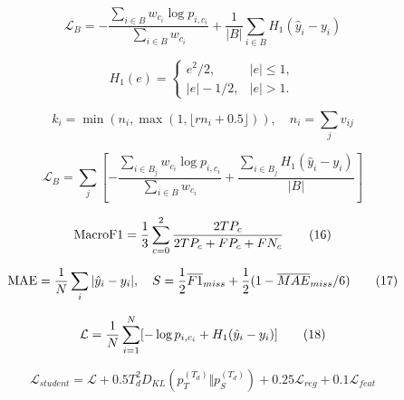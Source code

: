 \begin{equation}
\mathcal L_B=-\frac{\sum_{i\in B}w_{c_i}\log p_{i,c_i}}{\sum_{i\in B}w_{c_i}}+\frac{1}{|B|}\sum_{i\in B}H_1(\hat y_i-y_i)\tag{12}
\end{equation}

\begin{equation}
H_1(e)=\begin{cases}e^2/2,&|e|\le1,\\|e|-1/2,&|e|>1.\end{cases}\tag{13}
\end{equation}

\begin{equation}
k_i=\min(n_i,\max(1,\lfloor r n_i+0.5\rfloor)),\quad n_i=\sum_jv_{ij}\tag{14}
\end{equation}

\begin{equation}
\mathcal L_B=\sum_j\left[-\frac{\sum_{i\in B_j}w_{c_i}\log p_{i,c_i}}{\sum_{i\in B}w_{c_i}}+\frac{\sum_{i\in B_j}H_1(\hat y_i-y_i)}{|B|}\right]\tag{15}
\end{equation}

\begin{equation}
\operatorname{MacroF1}={1\over3}\sum_{c=0}^2{2TP_c\over2TP_c+FP_c+FN_c}\tag{16}
\end{equation}

\begin{equation}
\operatorname{MAE}={1\over N}\sum_i|\hat y_i-y_i|,\quad S={1\over2}\overline{F1}_{miss}+{1\over2}(1-\overline{MAE}_{miss}/6)\tag{17}
\end{equation}

\begin{equation}
\mathcal L={1\over N}\sum_{i=1}^N[-\log p_{i,c_i}+H_1(\hat y_i-y_i)]\tag{18}
\end{equation}

\begin{equation}
\mathcal L_{student}=\mathcal L+0.5T_d^2D_{KL}(p_T^{(T_d)}\Vert p_S^{(T_d)})+0.25\mathcal L_{reg}+0.1\mathcal L_{feat}\tag{19}
\end{equation}